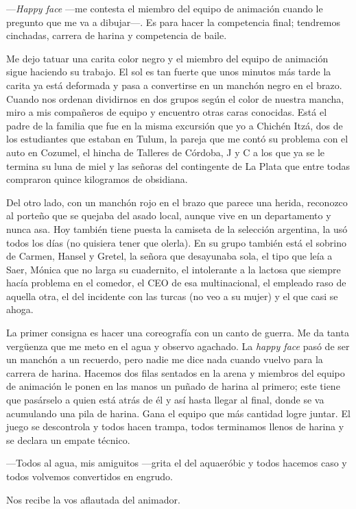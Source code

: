 \documentclass[12pt,twoside,openright,a5paper]{book}
\begin{document}
---\emph{Happy face} ---me contesta el miembro del equipo de animación cuando
le pregunto que me va a dibujar---. Es para hacer la competencia final;
tendremos cinchadas, carrera de harina y competencia de baile.

Me dejo tatuar una carita color negro y el miembro del equipo de animación
sigue haciendo su trabajo. El sol es tan fuerte que unos minutos más tarde
la carita ya está deformada y pasa a convertirse en un manchón negro en el
brazo. Cuando nos ordenan dividirnos en dos grupos según el color de nuestra
mancha, miro a mis compañeros de equipo y encuentro otras caras
conocidas. Está el padre de la familia que fue en la misma excursión que
yo a Chichén Itzá, dos de los estudiantes que estaban en Tulum, la pareja
que me contó su problema con el auto en Cozumel, el hincha de Talleres
de Córdoba, J y C a los que ya se le termina su luna de miel y las señoras
del contingente de La Plata que entre todas compraron quince kilogramos de obsidiana.

Del otro lado, con un manchón rojo en el brazo que parece una herida,
reconozco al porteño que se quejaba del asado local, aunque vive en
un departamento y nunca asa. Hoy también tiene puesta la camiseta de
la selección argentina, la usó todos los días (no quisiera tener que
olerla). En su grupo también está el sobrino de Carmen, Hansel y Gretel,
la señora que desayunaba sola, el tipo que leía a Saer, Mónica que no
larga su cuadernito, el intolerante a la lactosa que siempre hacía problema
en el comedor, el CEO de esa multinacional, el empleado raso de aquella otra,
el del incidente con las turcas (no veo a su mujer) y el que casi se ahoga.

La primer consigna es hacer una coreografía con un canto de guerra. Me da
tanta vergüenza que me meto en el agua y observo agachado. La \emph{happy face} pasó
de ser un manchón a un recuerdo, pero nadie me dice nada cuando vuelvo para
la carrera de harina. Hacemos dos filas sentados en la arena y miembros del
equipo de animación le ponen en las manos un puñado de harina al primero;
este tiene que pasárselo a quien está atrás de él y así hasta llegar
al final, donde se va acumulando una pila de harina. Gana el equipo que
más cantidad logre juntar. El juego se descontrola y todos hacen trampa,
todos terminamos llenos de harina y se declara un empate técnico. 

---Todos
al agua, mis amiguitos ---grita el del aquaeróbic y todos hacemos caso y todos
volvemos convertidos en engrudo.

Nos recibe la vos aflautada del animador.
\end{document}
